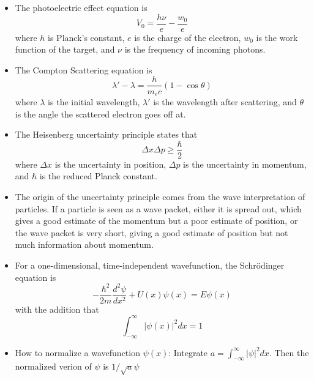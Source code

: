 \documentclass{article}
\begin{document}
\begin{itemize}
        \item The photoelectric effect equation is
        \begin{equation*}
            V_0 = \frac{h \nu}{e} - \frac{w_0}{e}
        \end{equation*}
        where $h$ is Planck's constant, $e$ is the charge of the electron, $w_0$ is the work function of the target, and $\nu$ is the frequency of incoming photons.

        \item The Compton Scattering equation is
        \begin{equation*}
            \lambda' - \lambda = \frac{h}{m_e c} (1-\cos \theta)
        \end{equation*}
        where $\lambda$ is the initial wavelength, $\lambda'$ is the wavelength after scattering, and $\theta$ is the angle the scattered electron goes off at.

        \item The Heisenberg uncertainty principle states that
        \begin{equation*}
            \Delta x \Delta p \geq \frac{\hbar}{2}
        \end{equation*}
        where $\Delta x$ is the uncertainty in position, $\Delta p$ is the uncertainty in momentum, and $\hbar$ is the reduced Planck constant.

        \item The origin of the uncertainty principle comes from the wave interpretation of particles. If a particle is seen as a wave packet, either it is spread out, which gives a good estimate of the momentum but a poor estimate of position, or the wave packet is very short, giving a good estimate of position but not much information about momentum.

        \item For a one-dimensional, time-independent wavefunction, the Schr\"odinger equation is
        \begin{equation*}
            -\frac{\hbar^2}{2m} \frac{d^2\psi}{dx^2} + U(x)\psi(x) = E\psi(x)
        \end{equation*}
        with the addition that
        \begin{equation*}
            \int_{-\infty}^{\infty} |\psi(x)|^2 dx = 1
        \end{equation*}

        \item How to normalize a wavefunction $\psi(x)$: Integrate $a = \int_{-\infty}^{\infty} |\psi|^2 dx$. Then the normalized verion of $\psi$ is $1/\sqrt{a} \psi$


\end{itemize}
\end{document}
